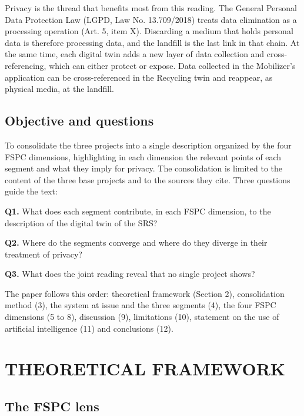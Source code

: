 \documentclass[12pt,a4paper,article,oneside,brazil,english]{abntex2}
\begin{document}
Privacy is the thread that benefits most from this reading. The General Personal Data Protection Law (LGPD, Law No. 13.709/2018) treats data elimination as a processing operation (Art. 5, item X). Discarding a medium that holds personal data is therefore processing data, and the landfill is the last link in that chain. At the same time, each digital twin adds a new layer of data collection and cross-referencing, which can either protect or expose. Data collected in the Mobilizer's application can be cross-referenced in the Recycling twin and reappear, as physical media, at the landfill.

\subsection{Objective and questions}

To consolidate the three projects into a single description organized by the four FSPC dimensions, highlighting in each dimension the relevant points of each segment and what they imply for privacy. The consolidation is limited to the content of the three base projects and to the sources they cite. Three questions guide the text:

\begin{list}{}{\setlength{\leftmargin}{0.635cm}\setlength{\itemsep}{0pt}\setlength{\topsep}{0pt}}
\item \textbf{Q1.} What does each segment contribute, in each FSPC dimension, to the description of the digital twin of the SRS?
\item \textbf{Q2.} Where do the segments converge and where do they diverge in their treatment of privacy?
\item \textbf{Q3.} What does the joint reading reveal that no single project shows?
\end{list}

The paper follows this order: theoretical framework (Section 2), consolidation method (3), the system at issue and the three segments (4), the four FSPC dimensions (5 to 8), discussion (9), limitations (10), statement on the use of artificial intelligence (11) and conclusions (12).

\section{THEORETICAL FRAMEWORK}

\subsection{The FSPC lens}
\end{document}
